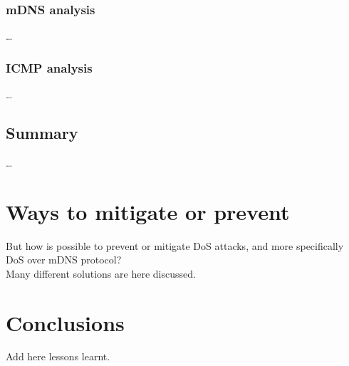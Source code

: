 \documentclass[fleqn, 10pt]{SelfArx} %
\begin{document}
\subsubsection{mDNS analysis}
\dots

\subsubsection{ICMP analysis}
\dots

\subsection{Summary}
\dots


\section{Ways to mitigate or prevent}
But how is possible to prevent or mitigate DoS attacks, and more specifically DoS over mDNS protocol? \\
Many different solutions are here discussed.


\section{Conclusions}
Add here lessons learnt.




\nocite{*}

\end{document}
